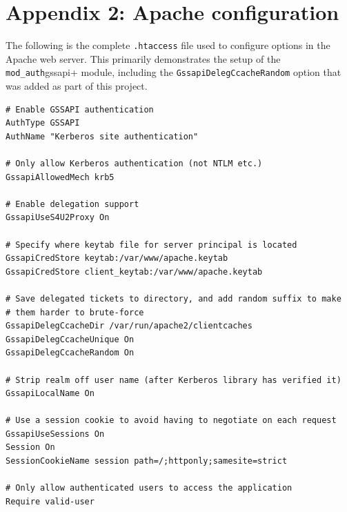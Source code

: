 \documentclass{article}
\begin{document}
\section*{Appendix 2: Apache configuration}
\label{sec:appendix2}

The following is the complete \verb+.htaccess+ file used to configure options in the Apache web server. This primarily demonstrates the setup of the \verb+mod_auth+gssapi+ module, including the \texttt{GssapiDelegCcacheRandom} option that was added as part of this project.

\begin{verbatim}
# Enable GSSAPI authentication
AuthType GSSAPI
AuthName "Kerberos site authentication"

# Only allow Kerberos authentication (not NTLM etc.)
GssapiAllowedMech krb5

# Enable delegation support
GssapiUseS4U2Proxy On

# Specify where keytab file for server principal is located
GssapiCredStore keytab:/var/www/apache.keytab
GssapiCredStore client_keytab:/var/www/apache.keytab

# Save delegated tickets to directory, and add random suffix to make
# them harder to brute-force
GssapiDelegCcacheDir /var/run/apache2/clientcaches
GssapiDelegCcacheUnique On
GssapiDelegCcacheRandom On

# Strip realm off user name (after Kerberos library has verified it)
GssapiLocalName On

# Use a session cookie to avoid having to negotiate on each request
GssapiUseSessions On
Session On
SessionCookieName session path=/;httponly;samesite=strict

# Only allow authenticated users to access the application
Require valid-user
\end{verbatim}
\end{document}
